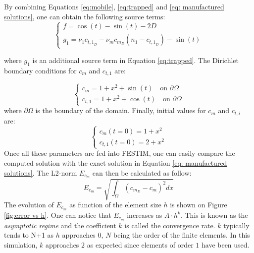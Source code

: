 By combining Equations \ref{eq:mobile}, \ref{eq:trapped} and \ref{eq: manufactured solutions}, one can obtain the following source terms:
\begin{equation}
    \begin{cases}
    f = \cos(t) - \sin(t) - 2D \\
    g_1 = \nu_1 c_{{t,1}_D} - \nu_m c_{m_D} ( n_1 - c_{{t,1}_D}) - \sin(t)
    \end{cases}
    \label{eq:sources}
\end{equation}

where $g_1$ is an additional source term in Equation \ref{eq:trapped}.
The Dirichlet boundary conditions for $c_m$ and $c_{t,1}$ are:

\begin{equation}
    \begin{cases}
    c_m = 1 + x^2 + \sin(t) \quad \text{on } \partial \Omega \\
    c_{t,1} = 1 + x^2 + \cos(t) \quad \text{on } \partial \Omega 
    \end{cases}
\end{equation}
where $\partial\Omega$ is the boundary of the domain.
Finally, initial values for $c_m$ and $c_{t,i}$ are:
\begin{equation}
    \begin{cases}
    c_m(t=0) = 1 + x^2 \\
    c_{t,1}(t=0) = 2 + x^2
    \end{cases}
\end{equation}
Once all these parameters are fed into FESTIM, one can easily compare the computed solution with the exact solution in Equation \ref{eq: manufactured solutions}.
The L2-norm $E_{c_m}$ can then be calculated as follow:
\begin{equation}
    E_{c_m} = \sqrt{\int_\Omega(c_{m_D} - c_m)^2dx}
\end{equation}
The evolution of $E_{c_m}$ as function of the element size $h$ is shown on Figure \ref{fig:error vs h}.
One can notice that $E_{c_m}$ increases as $A\cdot h^k$.
This is known as the \textit{asymptotic regime} and the coefficient $k$ is called the convergence rate.
$k$ typically tends to N+1 as $h$ approaches $0$, $N$ being the order of the finite elements.
In this simulation, $k$ approaches $2$ as expected since elements of order $1$ have been used.

